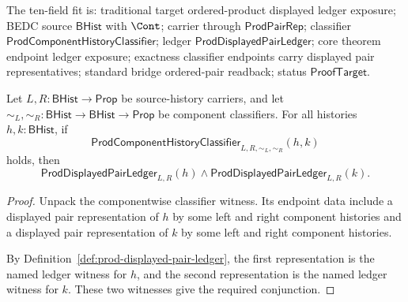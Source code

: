 \begin{theorem}
\label{thm:prod-component-history-classifier-displayed-ledger-endpoints}
The ten-field fit is: traditional target ordered-product displayed ledger
exposure; BEDC source $\mathsf{BHist}$ with $\Cont$; carrier through
$\mathsf{ProdPairRep}$; classifier
$\mathsf{ProdComponentHistoryClassifier}$; ledger
$\mathsf{ProdDisplayedPairLedger}$; core theorem endpoint ledger exposure;
exactness classifier endpoints carry displayed pair representatives; standard
bridge ordered-pair readback; status
$\mathsf{ProofTarget}$.

Let $L,R:\mathsf{BHist}\to\mathsf{Prop}$ be source-history carriers, and let
$\sim_L,\sim_R:\mathsf{BHist}\to\mathsf{BHist}\to\mathsf{Prop}$ be component
classifiers. For all histories $h,k:\mathsf{BHist}$, if
$$
\mathsf{ProdComponentHistoryClassifier}_{L,R,\sim_L,\sim_R}(h,k)
$$
holds, then
$$
\mathsf{ProdDisplayedPairLedger}_{L,R}(h)
\land
\mathsf{ProdDisplayedPairLedger}_{L,R}(k).
$$
\end{theorem}
\begin{proof}
Unpack the componentwise classifier witness. Its endpoint data include a
displayed pair representation of $h$ by some left and right component histories
and a displayed pair representation of $k$ by some left and right component
histories.

By Definition~\ref{def:prod-displayed-pair-ledger}, the first representation is
the named ledger witness for $h$, and the second representation is the named
ledger witness for $k$. These two witnesses give the required conjunction.
\end{proof}

